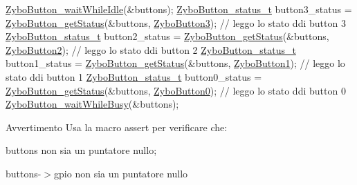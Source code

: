 \begin{DoxyCode}
\hyperlink{group___button_gaca30e81084e746785e395f79e9678e9a}{ZyboButton\_waitWhileIdle}(&buttons);
\hyperlink{group___button_ga85c290bfa232cab213e69200bf78e06a}{ZyboButton\_status\_t} button3\_status = \hyperlink{group___button_ga75407539e8ba0ad3ea142496219cd083}{ZyboButton\_getStatus}(&buttons, 
      \hyperlink{group___button_gga4d26a5f6cad606de534ba034e0ba42ddaabede392be8cae14b8a070a804c754e8}{ZyboButton3});               \textcolor{comment}{// leggo lo stato ddi button 3}
\hyperlink{group___button_ga85c290bfa232cab213e69200bf78e06a}{ZyboButton\_status\_t} button2\_status = \hyperlink{group___button_ga75407539e8ba0ad3ea142496219cd083}{ZyboButton\_getStatus}(&buttons, 
      \hyperlink{group___button_gga4d26a5f6cad606de534ba034e0ba42dda2aa888c8f01ac8a79013e5ebc9eef609}{ZyboButton2});               \textcolor{comment}{// leggo lo stato ddi button 2}
\hyperlink{group___button_ga85c290bfa232cab213e69200bf78e06a}{ZyboButton\_status\_t} button1\_status = \hyperlink{group___button_ga75407539e8ba0ad3ea142496219cd083}{ZyboButton\_getStatus}(&buttons, 
      \hyperlink{group___button_gga4d26a5f6cad606de534ba034e0ba42dda29c35ef3133898c050f675a60de66dd7}{ZyboButton1});               \textcolor{comment}{// leggo lo stato ddi button 1}
\hyperlink{group___button_ga85c290bfa232cab213e69200bf78e06a}{ZyboButton\_status\_t} button0\_status = \hyperlink{group___button_ga75407539e8ba0ad3ea142496219cd083}{ZyboButton\_getStatus}(&buttons, 
      \hyperlink{group___button_gga4d26a5f6cad606de534ba034e0ba42dda2f821ce9661687aefb0ec4de65911570}{ZyboButton0});               \textcolor{comment}{// leggo lo stato ddi button 0}
\hyperlink{group___button_ga3840edf011b5bad6302b7efc9c6326fe}{ZyboButton\_waitWhileBusy}(&buttons);
\end{DoxyCode}


\begin{DoxyWarning}{Avvertimento}
Usa la macro assert per verificare che\+:
\begin{DoxyItemize}
\item buttons non sia un puntatore nullo;
\item buttons-\/$>$gpio non sia un puntatore nullo 
\end{DoxyItemize}
\end{DoxyWarning}
